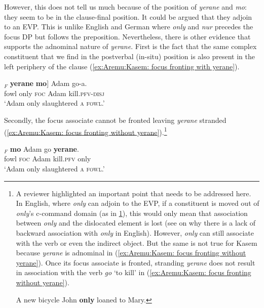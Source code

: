 \documentclass[output=paper,colorlinks,citecolor=brown,draftmode
]{langscibook}
\begin{document}
However, this does not tell us much because of the position of \textit{yerane} and \textit{mo}: they seem to be in the clause-final position. It could be argued that they adjoin to an EVP. This is unlike English and German where \textit{only} and \textit{nur} precedes the focus DP but follows the preposition. Nevertheless, there is other evidence that supports the adnominal nature of \textit{yerane}. First is the fact that the same complex constituent that we find in the postverbal (in-situ) position is also present in the left periphery of the clause (\ref{ex:Aremu:Kasem: focus fronting with yerane}). 


\ea \label{ex:Aremu:Kasem: focus fronting with yerane}

\gll [[Chworo]$_F$ \textbf{yerane} \textbf{mo}] Adam go-a.\\
	fowl only \textsc{foc} Adam kill.\textsc{pfv-disj}\\
\glt `Adam only slaughtered \textsc{a fowl}.'

\z



Secondly, the focus associate cannot be fronted leaving \textit{yerane} stranded (\ref{ex:Aremu:Kasem: focus fronting without yerane}).\footnote{A reviewer highlighted an important point that needs to be addressed here. In English, where \textit{only} can adjoin to the EVP, if a constituent is moved out of \textit{only}'s c-command domain (as in \ref{ex:Aremu:Eng:FF}), this would only mean that association between \textit{only} and the dislocated element is lost (see \citealt{erlewine2014a, erlewine2014b} on why there is a lack of backward association with \textit{only} in English). However, \textit{only} can still associate with the verb or even the indirect object. But the same is not true for Kasem because \textit{yerane} is adnominal in (\ref{ex:Aremu:Kasem: focus fronting without yerane}). Once its focus associate is fronted, stranding \textit{yerane} does not result in association with the verb \textit{go} `to kill' in (\ref{ex:Aremu:Kasem: focus fronting without yerane}).

\ea\label{ex:Aremu:Eng:FF} A new bicycle John \textbf{only} loaned to Mary.
\z
}


\ea \label{ex:Aremu:Kasem: focus fronting without yerane}

\gll *[Chworo]$_F$ \textbf{mo} Adam go \textbf{yerane}.\\
	fowl \textsc{foc} Adam kill.\textsc{pfv} only\\
\glt `Adam only slaughtered \textsc{a fowl}.'
\end{document}
